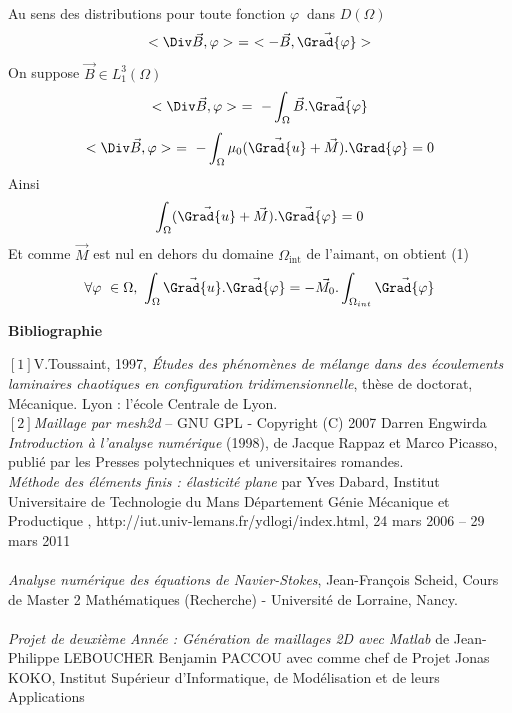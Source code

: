\documentclass[a4paper,12pt,titlepage]{report}
\begin{document}
\begin{onehalfspace}
\begin{appendix}
	Au sens des distributions pour toute fonction $\varphi\ $  dans $D(\Omega)$	
	\[<\Div\vec{B},\varphi> \ = \ <-\vec{B},\vec{\Grad{\varphi}}>\]
	On suppose $\vec{B} \in L^{3}_{1}(\Omega)$
	\[<\Div\vec{B},\varphi> \ = \  -\int_{\Omega}\vec{B}. \vec{\Grad{\varphi}}\]
	\[<\Div\vec{B},\varphi> \ = \ -\int_{\Omega}\mu_{0}(\vec{\Grad{u}}+\vec{M}) .{\Grad{\varphi}} = 0\]
	Ainsi
	\[\int_{\Omega}(\vec{\Grad{u}}+\vec{M}) . \vec{\Grad{\varphi}} = 0\]
	Et comme $\vec{M}$ est nul en dehors du domaine $\Omega_{\text{int}}$ de l'aimant, on obtient (1)
	\[
		\forall \varphi\ \in \Omega, \ \int_{\Omega}\vec{\Grad{u}}.\vec{\Grad{\varphi}} = -\vec{M_{0}}. \int_{\Omega_{int}}\vec{\Grad{\varphi}}
	\]
\fi

\end{appendix}
\end{onehalfspace}

\newpage
\normalsize \bf Bibliographie \\
\par


%
%

$[1]$V.Toussaint, 1997, \textit{Études des phénomènes de mélange dans des écoulements laminaires chaotiques en configuration tridimensionnelle}, thèse de doctorat, Mécanique. Lyon : l'école Centrale de Lyon.
\\
$[2]$\textit{Maillage par mesh2d} -- GNU GPL - Copyright (C) 2007 Darren Engwirda
\\
\textit{Introduction à l'analyse numérique} (1998), de Jacque Rappaz et Marco Picasso, publié par les Presses polytechniques et universitaires romandes.
\\

\textit{Méthode des éléments finis : élasticité plane} par Yves Dabard, Institut Universitaire de Technologie du Mans Département Génie Mécanique et Productique
, http://iut.univ-lemans.fr/ydlogi/index.html, 24 mars 2006 – 29 mars 2011
%
%
\\
\\
\textit{Analyse numérique des équations de Navier-Stokes}, Jean-François Scheid,  Cours de Master 2 Mathématiques (Recherche) - Université de Lorraine, Nancy.
\\
\\
\textit{Projet de deuxième Année : Génération de maillages 2D avec Matlab} de Jean-Philippe LEBOUCHER Benjamin PACCOU avec comme chef de Projet Jonas KOKO, Institut
Supérieur d’Informatique, de Modélisation et de leurs Applications
\end{document}

